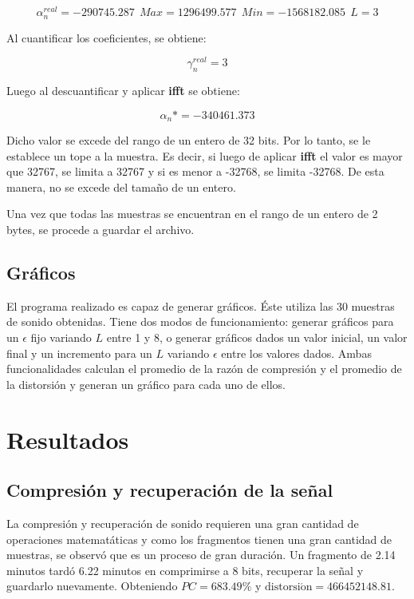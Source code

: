 \documentclass[12pt,a4paper]{article}
\begin{document}
$$\alpha^{real}_n = -290745.287 \:\: Max = 1296499.577 \:\: Min = -1568182.085 \:\: L = 3$$
      
	Al cuantificar los coeficientes, se obtiene:
    
$$\gamma^{real}_n = 3 $$ 
    
    Luego al descuantificar y aplicar \textbf{ifft} se obtiene:
    
$$\alpha_n* = -340461.373 $$

	Dicho valor se excede del rango de un entero de 32 bits. Por lo tanto, se le establece un tope a la muestra. Es decir, si luego de aplicar \textbf{ifft} el valor es mayor que 32767, se limita a 32767  y si es menor a -32768, se limita -32768. De esta manera, no se excede del tamaño de un entero. 
    
    Una vez que todas las muestras se encuentran en el rango de un entero de 2 bytes, se procede a guardar el archivo.
    
\subsection{Gráficos}
  
 	El programa realizado es capaz de generar gráficos. Éste utiliza las 30 muestras de sonido obtenidas. Tiene dos modos de funcionamiento: generar gráficos para un $\epsilon$ fijo variando $L$ entre 1 y 8, o generar gráficos dados un valor inicial, un valor final y un incremento para un $L$ variando $\epsilon$ entre los valores dados. Ambas funcionalidades calculan el promedio de la razón de compresión y el promedio de la distorsión y generan un gráfico para cada uno de ellos.
    
\section{Resultados}

\subsection{Compresión y recuperación de la señal}

   	La compresión y recuperación de sonido requieren una gran cantidad de operaciones matematáticas y como los fragmentos tienen una gran cantidad de muestras, se observó que es un proceso de gran duración. Un fragmento de 2.14 minutos tardó 6.22 minutos en comprimirse a 8 bits, recuperar la señal y guardarlo nuevamente. Obteniendo $PC = 683.49 \%$ y $\mathrm{distorsi\acute{o}n} = 466452148.81$. 
    
\end{document}
